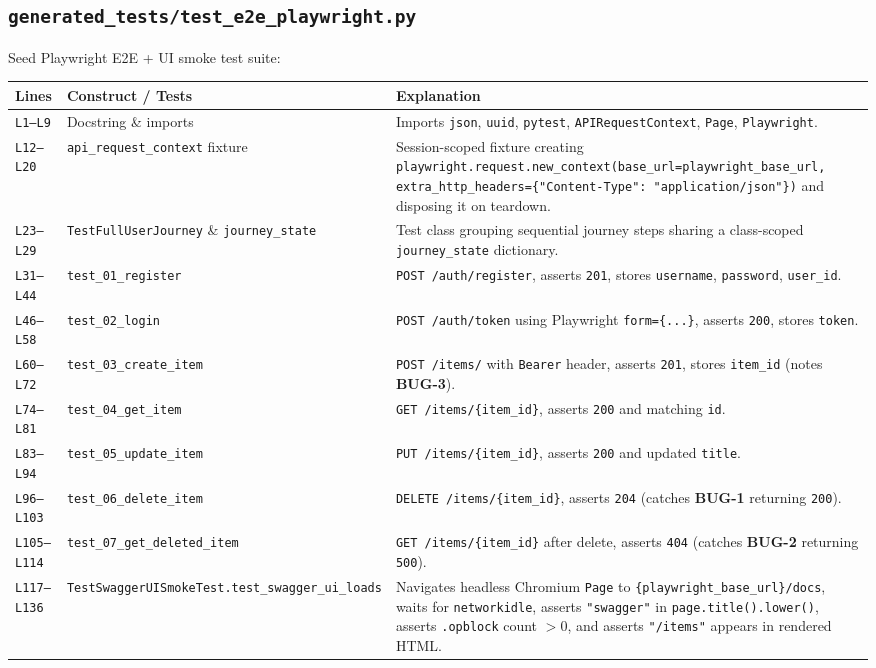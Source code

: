 \documentclass[11pt,a4paper]{article}
\begin{document}
\subsection{\texttt{generated\_tests/test\_e2e\_playwright.py}}
Seed Playwright E2E + UI smoke test suite:
\begin{longtable}{L{1.4cm} L{5.2cm} L{9.0cm}}
\toprule
\textbf{Lines} & \textbf{Construct / Tests} & \textbf{Explanation} \\
\midrule
\endhead
\texttt{L1--L9} & Docstring \& imports & Imports \texttt{json}, \texttt{uuid}, \texttt{pytest}, \texttt{APIRequestContext}, \texttt{Page}, \texttt{Playwright}. \\
\texttt{L12--L20} & \texttt{api\_request\_context} fixture & Session-scoped fixture creating \texttt{playwright.request.new\_context(base\_url=playwright\_base\_url, extra\_http\_headers=\{"Content-Type": "application/json"\})} and disposing it on teardown. \\
\texttt{L23--L29} & \texttt{TestFullUserJourney} \& \texttt{journey\_state} & Test class grouping sequential journey steps sharing a class-scoped \texttt{journey\_state} dictionary. \\
\texttt{L31--L44} & \texttt{test\_01\_register} & \texttt{POST /auth/register}, asserts \texttt{201}, stores \texttt{username}, \texttt{password}, \texttt{user\_id}. \\
\texttt{L46--L58} & \texttt{test\_02\_login} & \texttt{POST /auth/token} using Playwright \texttt{form=\{...\}}, asserts \texttt{200}, stores \texttt{token}. \\
\texttt{L60--L72} & \texttt{test\_03\_create\_item} & \texttt{POST /items/} with \texttt{Bearer} header, asserts \texttt{201}, stores \texttt{item\_id} (notes \textbf{BUG-3}). \\
\texttt{L74--L81} & \texttt{test\_04\_get\_item} & \texttt{GET /items/\{item\_id\}}, asserts \texttt{200} and matching \texttt{id}. \\
\texttt{L83--L94} & \texttt{test\_05\_update\_item} & \texttt{PUT /items/\{item\_id\}}, asserts \texttt{200} and updated \texttt{title}. \\
\texttt{L96--L103} & \texttt{test\_06\_delete\_item} & \texttt{DELETE /items/\{item\_id\}}, asserts \texttt{204} (catches \textbf{BUG-1} returning \texttt{200}). \\
\texttt{L105--L114} & \texttt{test\_07\_get\_deleted\_item} & \texttt{GET /items/\{item\_id\}} after delete, asserts \texttt{404} (catches \textbf{BUG-2} returning \texttt{500}). \\
\texttt{L117--L136} & \texttt{TestSwaggerUISmokeTest.test\_swagger\_ui\_loads} & Navigates headless Chromium \texttt{Page} to \texttt{\{playwright\_base\_url\}/docs}, waits for \texttt{networkidle}, asserts \texttt{"swagger"} in \texttt{page.title().lower()}, asserts \texttt{.opblock} count $> 0$, and asserts \texttt{"/items"} appears in rendered HTML. \\
\bottomrule
\end{longtable}
\end{document}
